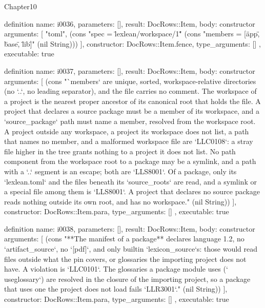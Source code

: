 \begin{lexlean}{Chapter10}
\begin{semanticmodule}
definition{
  name: i0036,
  parameters: [],
  result: DocRows::Item,
  body: constructor{
    arguments: [
      "toml",
      (cons "spec = \"lexlean/workspace/1\"" (cons "members = [\"app\", \"base\", \"lib\"]" (nil String)))
    ],
    constructor: DocRows::Item.fence,
    type_arguments: []
  },
  executable: true
}

definition{
  name: i0037,
  parameters: [],
  result: DocRows::Item,
  body: constructor{
    arguments: [
      (cons "`members` are unique, sorted, workspace-relative directories (no `..`, no leading separator), and the file carries no comment. The workspace of a project is the nearest proper ancestor of its canonical root that holds the file. A project that declares a source package must be a member of its workspace, and a `source_package` path must name a member, resolved from the workspace root. A project outside any workspace, a project its workspace does not list, a path that names no member, and a malformed workspace file are `LLC0108`: a stray file higher in the tree grants nothing to a project it does not list. No path component from the workspace root to a package may be a symlink, and a path with a `..` segment is an escape; both are `LLS8001`. Of a package, only its `lexlean.toml` and the files beneath its `source_roots` are read, and a symlink or a special file among them is `LLS8001`. A project that declares no source package reads nothing outside its own root, and has no workspace." (nil String))
    ],
    constructor: DocRows::Item.para,
    type_arguments: []
  },
  executable: true
}

definition{
  name: i0038,
  parameters: [],
  result: DocRows::Item,
  body: constructor{
    arguments: [
      (cons "**The manifest of a package** declares language 1.2, no `artifact_source`, no `[pdf]`, and only builtin `lexicon_source`s: those would read files outside what the pin covers, or glossaries the importing project does not have. A violation is `LLC0101`. The glossaries a package module uses (`\\useglossary`) are resolved in the closure of the importing project, so a package that uses one the project does not load fails `LLR3001`." (nil String))
    ],
    constructor: DocRows::Item.para,
    type_arguments: []
  },
  executable: true
}


\end{semanticmodule}
\end{lexlean}
